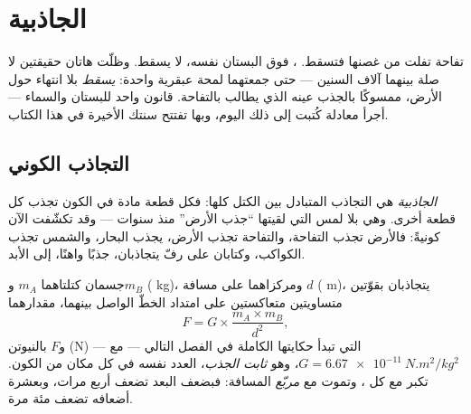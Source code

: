 \chapter{الجاذبية}\label{ch:g9:gravitation}

تفاحة تفلت من غصنها فتسقط. ، فوق البستان نفسه، لا يسقط.
وظلّت هاتان حقيقتين لا صلة بينهما آلاف السنين --- حتى جمعتهما
لمحة عبقرية واحدة:  \emph{يسقط} بلا انتهاء حول الأرض،
ممسوكًا بالجذب عينه الذي يطالب بالتفاحة. قانون واحد للبستان
والسماء --- أجرأ معادلة كُتبت إلى ذلك اليوم، وبها تفتتح سنتك
الأخيرة في هذا الكتاب.

\section{التجاذب الكوني}

\begin{definition}[الجاذبية]\label{def:g9:gravitation:gravitation}
\emph{الجاذبية} هي التجاذب المتبادل بين الكتل
كلها: فكل قطعة مادة في الكون تجذب كل قطعة أخرى. وهي  بلا
لمس التي لقيتها ``جذب الأرض'' منذ سنوات --- وقد تكشّفت الآن
كونيةً: فالأرض تجذب التفاحة، والتفاحة تجذب الأرض،  يجذب
البحار، والشمس تجذب الكواكب، وكتابان على رفّ يتجاذبان، جذبًا
واهنًا، إلى الأبد.
\end{definition}

\begin{proposition}\label{prop:g9:gravitation:law}
جسمان كتلتاهما $m_A$ و$m_B$ ( \unit{kg})، ومركزاهما على
مسافة $d$ ( \unit{m})، يتجاذبان بقوّتين متساويتين
متعاكستين على امتداد الخطّ الواصل بينهما، مقدارهما
\[
F = G \times \frac{m_A \times m_B}{d^2},
\]
و$F$ بالنيوتن (\unit{N}) ---   التي تبدأ حكايتها
الكاملة في الفصل التالي --- مع
$G = \qty{6.67e-11}{N.m^2/kg^2}$، وهو \emph{ثابت الجذب}،
العدد نفسه في كل مكان من الكون.  تكبر مع كل ، وتموت
مع \emph{مربّع} المسافة: فبضعف البعد تضعف أربع مرات، وبعشرة
أضعافه تضعف مئة مرة.
\end{proposition}

